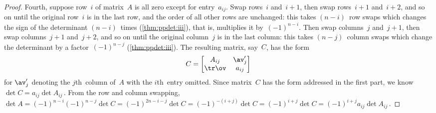 \begin{proof}
Fourth, suppose row~\(i\) of matrix~\(A\) is all zero except for entry~\(a_{ij}\).
Swap rows~\(i\) and~\(i+1\), then swap rows~\(i+1\) and~\(i+2\), and so on until the original row~\(i\) is in the last row, and the order of all other rows are unchanged: this takes \((n-i)\)~row swaps which changes the sign of the determinant \((n-i)\)~times (\autoref{thm:ppdet:iii}), that is, multiplies it by~\((-1)^{n-i}\).
Then swap columns~\(j\) and~\(j+1\), then swap columns~\(j+1\) and~\(j+2\), and so on until the original column~\(j\) is in the last column: this takes \((n-j)\)~column swaps which change the determinant by a factor~\((-1)^{n-j}\) (\autoref{thm:ppdet:iii}).
The resulting matrix, say~\(C\), has the form
\begin{equation*}
C=\begin{bmatrix} A_{ij}&\av'_j\\\tr\ov&a_{ij} \end{bmatrix}
\end{equation*}
for \(\av'_j\) denoting the \(j\)th~column of~\(A\) with the \(i\)th~entry omitted.
Since matrix~\(C\) has the form addressed in the first part, we know \(\det C=a_{ij}\det A_{ij}\)\,.
From the row and column swapping, \(\det A=(-1)^{n-i}(-1)^{n-j}\det C =(-1)^{2n-i-j}\det C =(-1)^{-(i+j)}\det C =(-1)^{i+j}\det C =(-1)^{i+j}a_{ij}\det A_{ij}\)\,.
\end{proof}




